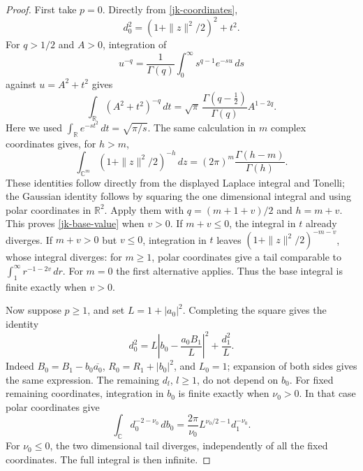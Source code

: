 \begin{proof}
First take \(p=0\).  Directly from \eqref{jk-coordinates},
\[
 d_0^2=(1+\|z\|^2/2)^2+t^2.
\]
For \(q>1/2\) and \(A>0\), integration of
\[
 u^{-q}=\frac{1}{\Gamma(q)}
                   \int_0^\infty s^{q-1}e^{-su}\,ds
\]
against \(u=A^2+t^2\) gives
\[
 \int_{\mathbb R}(A^2+t^2)^{-q}\,dt
  =\sqrt\pi\,\frac{\Gamma(q-\tfrac12)}{\Gamma(q)}
                      A^{1-2q}.
\]
Here we used \(\int_{\mathbb R}e^{-st^2}\,dt=\sqrt{\pi/s}\).
The same calculation in \(m\) complex coordinates gives, for \(h>m\),
\[
 \int_{\mathbb C^m}(1+\|z\|^2/2)^{-h}\,dz
                    =(2\pi)^m\frac{\Gamma(h-m)}{\Gamma(h)}.
\]
These identities follow directly from the displayed Laplace
integral and Tonelli; the Gaussian identity follows by squaring the
one dimensional integral and using polar coordinates in
\(\mathbb R^2\).
Apply them with \(q=(m+1+v)/2\) and \(h=m+v\).
This proves \eqref{jk-base-value} when \(v>0\).
If \(m+v\leq0\), the integral in \(t\) already diverges.
If \(m+v>0\) but \(v\leq0\), integration in \(t\) leaves
\((1+\|z\|^2/2)^{-m-v}\), whose integral diverges:
for \(m\geq1\), polar coordinates give a tail comparable to
\(\int_1^\infty r^{-1-2v}\,dr\).
For \(m=0\) the first alternative applies.
Thus the base integral is finite exactly when \(v>0\).

Now suppose \(p\geq1\), and set \(L=1+|a_0|^2\).
Completing the square gives the identity
\begin{equation}\label{jk-square}
 d_0^2=
 L\left|b_0-\frac{a_0B_1}{L}\right|^2+\frac{d_1^2}{L}.
\end{equation}
Indeed \(B_0=B_1-b_0\overline{a_0}\),
\(R_0=R_1+|b_0|^2\), and \(L_0=1\);
expansion of both sides gives the same expression.
The remaining \(d_l\), \(l\geq1\), do not depend on \(b_0\).
For fixed remaining coordinates, integration in \(b_0\) is finite
exactly when \(\nu_0>0\).  In that case polar coordinates give
\begin{equation}\label{jk-first-integration}
 \int_{\mathbb C}d_0^{-2-\nu_0}\,db_0
       =\frac{2\pi}{\nu_0}L^{\nu_0/2-1}d_1^{-\nu_0}.
\end{equation}
For \(\nu_0\leq0\), the two dimensional tail diverges, independently
of all the fixed coordinates.  The full integral is then infinite.


\end{proof}
